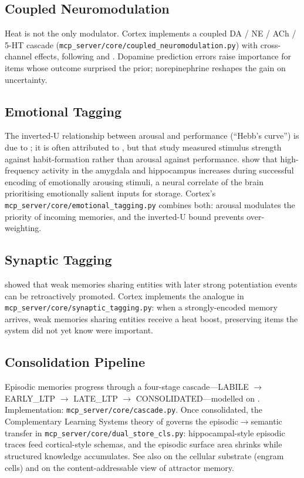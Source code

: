 \documentclass[11pt]{article}
\begin{document}
\subsection{Coupled Neuromodulation}
\label{sec:neuromod}

Heat is not the only modulator.  Cortex implements a coupled
DA / NE / ACh / 5-HT cascade
(\texttt{mcp\_server/core/coupled\_neuromodulation.py}) with
cross-channel effects, following \citet{Doya2002} and
\citet{Schultz1997}.  Dopamine prediction errors raise importance
for items whose outcome surprised the prior; norepinephrine
reshapes the gain on uncertainty.

\subsection{Emotional Tagging}
\label{sec:emotional}

The inverted-U relationship between arousal and performance
(``Hebb's curve'') is due to \citet{Hebb1955}; it is often
attributed to \citet{Yerkes1908}, but that study measured stimulus
strength against habit-formation rather than arousal against
performance.  \citet{Qasim2023} show that
high-frequency activity in the amygdala and hippocampus increases
during successful encoding of emotionally arousing stimuli, a
neural correlate of the brain prioritising emotionally salient
inputs for storage.
Cortex's \texttt{mcp\_server/core/emotional\_tagging.py} combines
both: arousal modulates the priority of incoming memories, and the
inverted-U bound prevents over-weighting.

\subsection{Synaptic Tagging}
\label{sec:synaptic}

\citet{Frey1997} showed that weak memories sharing entities with
later strong potentiation events can be retroactively promoted.
Cortex implements the analogue in
\texttt{mcp\_server/core/synaptic\_tagging.py}: when a
strongly-encoded memory arrives, weak memories sharing entities
receive a heat boost, preserving items the system did not yet know
were important.

\subsection{Consolidation Pipeline}
\label{sec:consolidation}

Episodic memories progress through a four-stage cascade---LABILE
$\to$ EARLY\_LTP $\to$ LATE\_LTP $\to$ CONSOLIDATED---modelled on
\citet{Kandel2001}.  Implementation:
\texttt{mcp\_server/core/cascade.py}.  Once consolidated, the
Complementary Learning Systems theory of \citet{McClelland1995}
governs the episodic$\to$semantic transfer in
\texttt{mcp\_server/core/dual\_store\_cls.py}: hippocampal-style
episodic traces feed cortical-style schemas, and the episodic
surface area shrinks while structured knowledge accumulates.  See
also \citet{Tonegawa2015} on the cellular substrate (engram cells)
and \citet{Hopfield1982} on the content-addressable view of
attractor memory.
\end{document}

